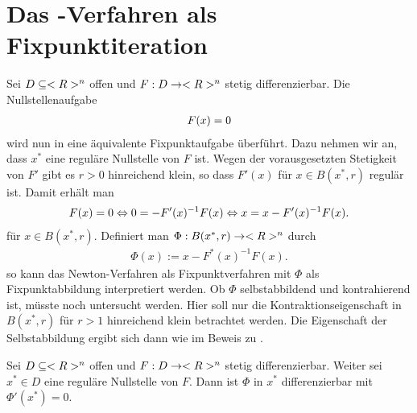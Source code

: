 \section{Das -Verfahren als Fixpunktiteration}

Sei $D \subseteq <R>^n$ offen und $F: D \to <R>^n$ stetig differenzierbar. Die Nullstellenaufgabe
\begin{align}
	F(x) = 0\notag
\end{align}
wird nun in eine äquivalente Fixpunktaufgabe überführt. Dazu nehmen wir an, dass $x^{\ast}$ eine reguläre Nullstelle von $F$ ist. Wegen der vorausgesetzten Stetigkeit von $F'$ gibt es $r>0$ hinreichend klein, so dass $F'(x)$ für $x \in B(x^{\ast},r)$ regulär ist. Damit erhält man
\begin{align}
	F(x) = 0 \Leftrightarrow 0 = -F'(x)^{-1}F(x) \Leftrightarrow x = x - F'(x)^{-1}F(x).\notag
\end{align}
für $x \in B(x^{\ast},r)$. Definiert man $\Phi: B(x^{\ast},r) \to <R>^n$ durch
\begin{align}
	\Phi(x):= x - F^{\ast}(x)^{-1}F(x). \label{eq_1_3_8}
\end{align}
so kann das Newton-Verfahren als Fixpunktverfahren mit $\Phi$ als Fixpunktabbildung interpretiert werden. Ob $\Phi$ selbstabbildend und kontrahierend ist, müsste noch untersucht werden. Hier soll nur die Kontraktionseigenschaft in $B(x^{\ast},r)$ für $r>1$ hinreichend klein betrachtet werden. Die Eigenschaft der Selbstabbildung ergibt sich dann wie im Beweis zu .

\begin{lemma}
	Sei $D\subseteq <R>^n$ offen und $F: D \to <R>^n$ stetig differenzierbar. Weiter sei $x^{\ast}\in D$ eine reguläre Nullstelle von $F$. Dann ist $\Phi$ in $x^{\ast}$ differenzierbar mit $\Phi'(x^{\ast}) = 0$.
\end{lemma}

